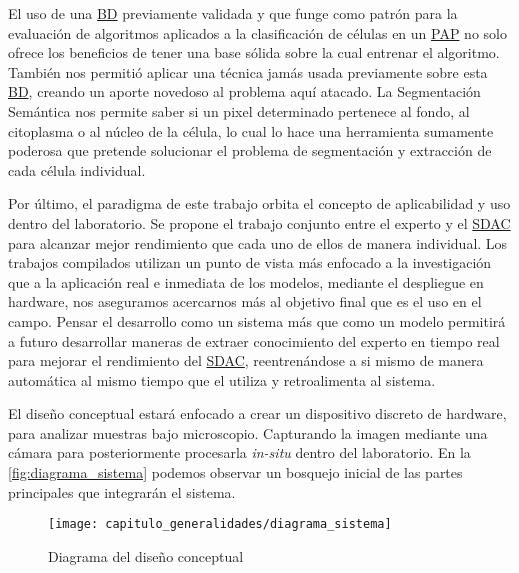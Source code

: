 El uso de una \hyperlink{abbr}{BD} previamente validada y que funge como patrón
para la evaluación de algoritmos aplicados a la clasificación de células en un
\hyperlink{abbr}{PAP} no solo ofrece los beneficios de tener una base sólida
sobre la cual entrenar el algoritmo. También nos permitió aplicar una técnica
jamás usada previamente sobre esta \hyperlink{abbr}{BD}, creando un aporte
novedoso al problema aquí atacado. La Segmentación Semántica nos permite saber
si un pixel determinado pertenece al fondo, al citoplasma o al núcleo de la
célula, lo cual lo hace una herramienta sumamente poderosa que pretende
solucionar el problema de segmentación y extracción de cada célula individual.

Por último, el paradigma de este trabajo orbita el concepto de aplicabilidad y
uso dentro del laboratorio. Se propone el trabajo conjunto entre el experto y el
\hyperlink{abbr}{SDAC} para alcanzar mejor rendimiento que cada uno de ellos de
manera individual. Los trabajos compilados utilizan un punto de vista más
enfocado a la investigación que a la aplicación real e inmediata de los modelos,
mediante el despliegue en hardware, nos aseguramos acercarnos más al objetivo
final que es el uso en el campo. Pensar el desarrollo como un sistema más que
como un modelo permitirá a futuro desarrollar maneras de extraer conocimiento
del experto en tiempo real para mejorar el rendimiento del
\hyperlink{abbr}{SDAC}, reentrenándose a si mismo de manera automática al mismo
tiempo que el utiliza y retroalimenta al sistema. 

El diseño conceptual estará enfocado a crear un dispositivo discreto de
hardware, para analizar muestras bajo microscopio. Capturando la imagen mediante
una cámara para posteriormente procesarla \emph{in-situ} dentro del laboratorio.
En la \autoref{fig:diagrama_sistema} podemos observar un bosquejo inicial de las
partes principales que integrarán el sistema.

\begin{figure}[H]
    \centering
    \texttt{[image: capitulo\_generalidades/diagrama\_sistema]}
    \caption{Diagrama del diseño conceptual}\label{fig:diagrama_sistema}
\end{figure}